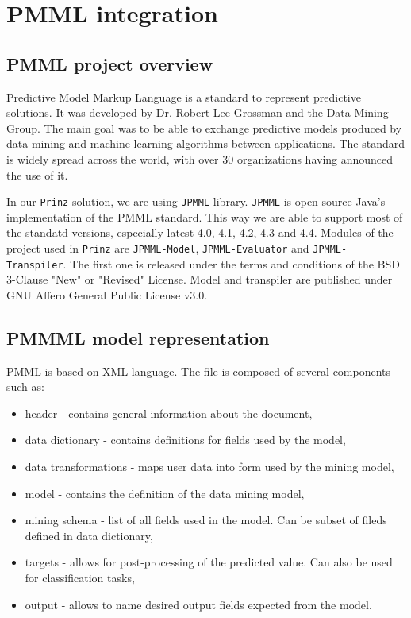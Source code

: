 \chapter{PMML integration}
\label{chap:pmml}

\section{PMML project overview}

Predictive Model Markup Language is a standard to represent predictive solutions.
It was developed by Dr. Robert Lee Grossman and the Data Mining Group.
The main goal was to be able to exchange predictive models produced by data mining
and machine learning algorithms between applications. The standard is widely spread across the world,
with over 30 organizations having announced the use of it.\cite{dmgpage}\cite{pmmlpowered}

In our \texttt{Prinz} solution, we are using \texttt{JPMML} library. \texttt{JPMML} is open-source Java's
implementation of the PMML standard. This way we are able to support most of the standatd versions, especially latest
4.0, 4.1, 4.2, 4.3 and 4.4. Modules of the project used in \texttt{Prinz} are \texttt{JPMML-Model},
\texttt{JPMML-Evaluator} and \texttt{JPMML-Transpiler}. The first one is released under the terms and conditions
of the BSD 3-Clause "New" or "Revised" License. Model and transpiler are published under GNU Affero General Public License v3.0.\cite{jpmml}


\section{PMMML model representation}

PMML is based on XML language. The file is composed of several components such as:
\begin{itemize}
    \item header - contains general information about the document,
    \item data dictionary - contains definitions for fields used by the model,
    \item data transformations - maps user data into form used by the mining model,
    \item model - contains the definition of the data mining model,
    \item mining schema - list of all fields used in the model. Can be subset of fileds defined in data dictionary,
    \item targets - allows for post-processing of the predicted value. Can also be used for classification tasks,
    \item output - allows to name desired output fields expected from the model.
\end{itemize}


